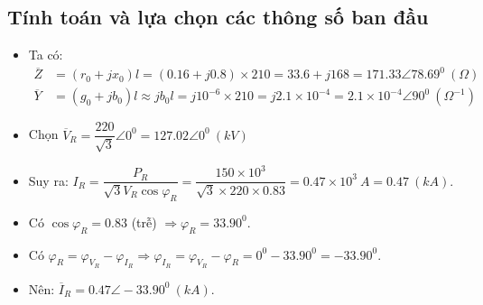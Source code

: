 \documentclass[12pt,a4paper]{article}
\newcommand{\unit}[1]{~#1}
\newcommand{\unitp}[1]{~\left({#1}\right)}
\newcommand{\pfm}[1]{\left({#1}\right)}
\begin{document}
\subsection{Tính toán và lựa chọn các thông số ban đầu}
	\begin{itemize}
		\item Ta có:
		\begin{align*}
			\overline{Z} & = \pfm{r_0 + j x_0}l = \pfm{0.16 +j 0.8}\times 210 = 33.6 + j 168 = 171.33 \angle 78.69^0 \unitp{\Omega}\\
			\overline{Y} & = \pfm{g_0 + j b_0}l \approx j b_0 l = j 10^{-6}\times 210 = j 2.1 \times 10^{-4} = 2.1 \times 10^{-4} \angle 90^0 \unitp{\Omega^{-1}}
		\end{align*}

		\item Chọn $\overline{V}_R = \dfrac{220}{\sqrt{3}} \angle 0^0 = 127.02 \angle 0^0 \unitp{kV} $

		\item Suy ra: $I_R = \dfrac{P_R}{\sqrt{3}V_R \cos \varphi_R} = \dfrac{150 \times 10^3} {\sqrt{3} \times 220 \times 0.83} = 0.47 \times 10^3 \unit{A} = 0.47\unitp{kA}$.

		\item Có $\cos \varphi_R = 0.83$ (trễ) $\Longrightarrow \varphi_R = 33.90^0$.

		\item Có $\varphi_R = \varphi_{V_R} - \varphi_{I_R} \Longrightarrow \varphi_{I_R} = \varphi_{V_R} - \varphi_R = 0^0 - 33.90^0 = -33.90^0$.

		\item Nên: $\overline{I}_R = 0.47 \angle -33.90^0 \unitp{kA}$.
	\end{itemize}
\end{document}
